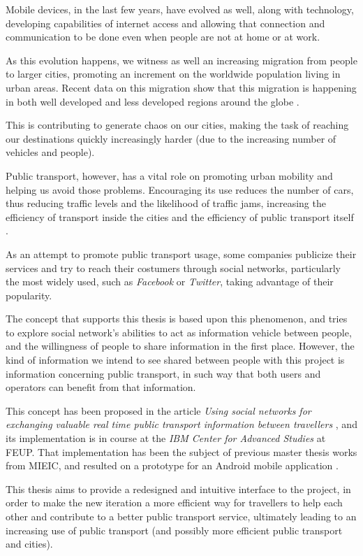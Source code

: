 Mobile devices, in the last few years, have evolved as well, along with technology, developing capabilities of internet access and allowing that connection and communication to be done even when people are not at home or at work.

As this evolution happens, we witness as well an increasing migration from people to larger cities, promoting an increment on the worldwide population living in urban areas. Recent data on this migration show that this migration is happening in both well developed and less developed regions around the globe \cite{kn:NAT11}.

This is contributing to generate chaos on our cities, making the task of reaching our destinations quickly increasingly harder (due to the increasing number of vehicles and people).

Public transport, however, has a vital role on promoting urban mobility and helping us avoid those problems. Encouraging its use reduces the number of cars, thus reducing traffic levels and the likelihood of traffic jams, increasing the efficiency of transport inside the cities and the efficiency of public transport itself \cite{kn:CSV11}.

As an attempt to promote public transport usage, some companies publicize their services and try to reach their costumers through social networks, particularly the most widely used, such as \emph{Facebook} or \emph{Twitter}, taking advantage of their popularity.

The concept that supports this thesis is based upon this phenomenon, and tries to explore social network's abilities to act as information vehicle between people, and the willingness of people to share information in the first place. However, the kind of information we intend to see shared between people with this project is information concerning public transport, in such way that both users and operators can benefit from that information. 

This concept has been proposed in the article \emph{Using social networks for exchanging valuable real time public transport information between travellers} \cite{kn:NGeCP11}, and its implementation is in course at the \emph{IBM Center for Advanced Studies} at FEUP. That implementation has been the subject of previous master thesis works from MIEIC, and resulted on a prototype for an Android mobile application \cite{kn:eSG12}. 

This thesis aims to provide a redesigned and intuitive interface to the project, in order to make the new iteration a more efficient way for travellers to help each other and contribute to a better public transport service, ultimately leading to an increasing use of public transport (and possibly more efficient public transport and cities). 

